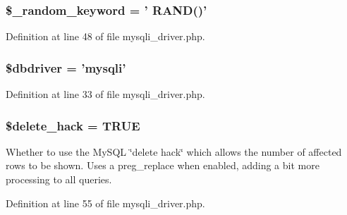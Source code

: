 \hypertarget{class_c_i___d_b__mysqli__driver_a10213aa6e05f6d924d3277bb1d2fea00}{
\subsubsection[{\$\-\_\-random\-\_\-keyword}]{\setlength{\rightskip}{0pt plus 5cm}\$\-\_\-random\-\_\-keyword = ' R\-A\-N\-D()'}}\label{class_c_i___d_b__mysqli__driver_a10213aa6e05f6d924d3277bb1d2fea00}


Definition at line 48 of file mysqli\-\_\-driver.\-php.

\hypertarget{class_c_i___d_b__mysqli__driver_a0cde2a16322a023d040aa7f725877597}{
\subsubsection[{\$dbdriver}]{\setlength{\rightskip}{0pt plus 5cm}\$dbdriver = 'mysqli'}}\label{class_c_i___d_b__mysqli__driver_a0cde2a16322a023d040aa7f725877597}


Definition at line 33 of file mysqli\-\_\-driver.\-php.

\hypertarget{class_c_i___d_b__mysqli__driver_ad60008f32a478e978c7c3284f320f273}{
\subsubsection[{\$delete\-\_\-hack}]{\setlength{\rightskip}{0pt plus 5cm}\$delete\-\_\-hack = T\-R\-U\-E}}\label{class_c_i___d_b__mysqli__driver_ad60008f32a478e978c7c3284f320f273}
Whether to use the My\-S\-Q\-L \char`\"{}delete hack\char`\"{} which allows the number of affected rows to be shown. Uses a preg\-\_\-replace when enabled, adding a bit more processing to all queries. 

Definition at line 55 of file mysqli\-\_\-driver.\-php.

